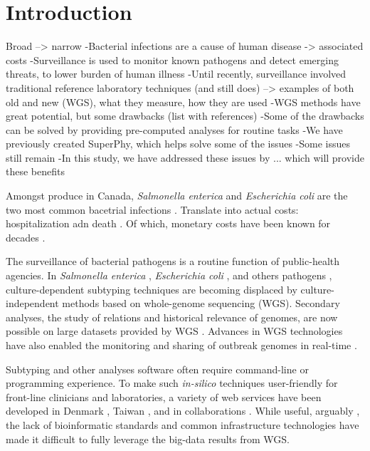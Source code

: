 \documentclass[a4,center,fleqn]{NAR}
\begin{document}
\section{Introduction}
Broad --> narrow
-Bacterial infections are a cause of human disease -> associated costs
-Surveillance is used to monitor known pathogens and detect emerging threats, to lower burden of human illness
-Until recently, surveillance involved traditional reference laboratory techniques (and still does) --> examples of both old and new (WGS), what they measure, how they are used
-WGS methods have great potential, but some drawbacks (list with references)
-Some of the drawbacks can be solved by providing pre-computed analyses for routine tasks
-We have previously created SuperPhy, which helps solve some of the issues
-Some issues still remain
-In this study, we have addressed these issues by ... which will provide these benefits

Amongst produce in Canada, \textit{Salmonella enterica} and \textit{Escherichia coli} are the two most common bacetrial infections \cite{kozak2013foodborne}.
Translate into actual costs: hospitalization adn death \cite{thomas2015estimates}.
Of which, monetary costs have been known for decades \cite{todd1989costs}.

The surveillance of bacterial pathogens is a routine function of public-health agencies.
In \textit{Salmonella enterica} \cite{bell2016recent}, \textit{Escherichia coli} \cite{fratamico2016advances}, and others pathogens \cite{ronholm2016navigating}, culture-dependent subtyping techniques are becoming displaced by culture-independent methods based on whole-genome sequencing (WGS).
Secondary analyses, the study of relations and historical relevance of genomes, are now possible on large datasets provided by WGS \cite{ronholm2016navigating}.
Advances in WGS technologies have also enabled the monitoring and sharing of outbreak genomes in real-time \cite{ronholm2016navigating}.

Subtyping and other analyses software often require command-line or programming experience.
To make such \textit{in-silico} techniques user-friendly for front-line clinicians and laboratories, a variety of web services have been developed in Denmark \cite{joensen2014real}, Taiwan \cite{liu2016construction}, and in collaborations \cite{hasman2015detection}.
While useful, arguably \cite{fricke2014bacterial}, the lack of bioinformatic standards and common infrastructure technologies have made it difficult to fully leverage the big-data results from WGS. 
\end{document}
